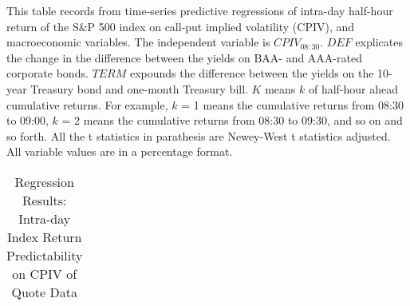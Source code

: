 \begin{table}[h]
\begin{threeparttable}
\end{threeparttable}

\end{table}




\begin{table}[h]

\caption{Regression Results: Intra-day Index Return Predictability on CPIV of Quote Data}\label{table:regression4}
\begin{threeparttable}

\medskip
\begin{spacing}{1.1}
{\scriptsize  
This table records from time-series predictive regressions of intra-day half-hour return of the S\&P 500 index on call-put implied volatility (CPIV), and macroeconomic variables. The independent variable is $CPIV_{08:30}$. $DEF$ explicates the change in the difference between the yields on BAA- and AAA-rated corporate bonds. $TERM$ expounds the difference between the yields on the 10-year Treasury bond and one-month Treasury bill. $K$ means $k$ of half-hour ahead cumulative returns. For example, $k$ = 1 means the cumulative returns from 08:30 to 09:00, $k$ = 2 means the cumulative returns from 08:30 to 09:30, and so on and so forth. All the t statistics in parathesis are Newey-West t statistics adjusted. All variable values are in a percentage format. 
}
\end{spacing}
\medskip
\tiny

\begin{tabular}{ccccccccccccccc}
\toprule


\end{tabular}
\end{threeparttable}
\end{table}
